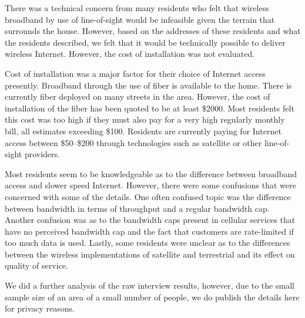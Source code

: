 There was a technical concern from many residents who felt that wireless broadband by use of
line-of-sight would be infeasible given the terrain that surrounds the house. However, based
on the addresses of these residents and what the residents described, we felt
that it would be technically possible to deliver wireless Internet. However, the cost of
installation was not evaluated.

Cost of installation was a major factor for their choice of Internet access presently. Broadband
through the use of fiber is available to the home. There is currently fiber deployed on many
streets in the area. However, the cost of installation of the fiber has been quoted to be at least \$2000.
Most residents felt this cost was too high if they must also pay for a very high regularly monthly bill, all
estimates exceeding \$100. Residents are currently paying for Internet access between \$50--\$200
through technologies such as satellite or other line-of-sight providers.

Most residents seem to be knowledgeable as to the difference between broadband access and slower speed Internet.
However, there were some confusions that were concerned with some of the details. One often confused topic was
the difference between bandwidth in terms of throughput and a regular bandwidth cap. Another confusion was
as to the bandwidth caps present in cellular services that have no perceived bandwidth cap and the fact that
customers are rate-limited if too much data is used. Lastly, some residents were unclear as to the differences
between the wireless implementations of satellite and terrestrial and its effect on quality of service.

We did a further analysis of the raw interview results, however, due to the small sample size of an area of a small number of people,
we do publish the details here for privacy reasons.


